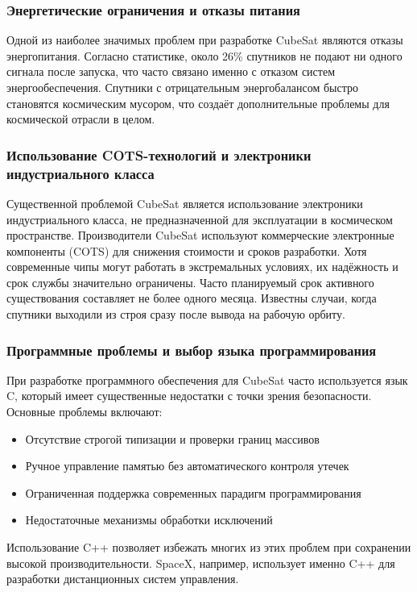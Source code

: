 \subsubsection{Энергетические ограничения и отказы питания}
Одной из наиболее значимых проблем при разработке CubeSat являются отказы энергопитания. Согласно статистике, около 26\% спутников не подают ни одного сигнала после запуска, что часто связано именно с отказом систем энергообеспечения\cite{kulu2020nanosats}. Спутники с отрицательным энергобалансом быстро становятся космическим мусором, что создаёт дополнительные проблемы для космической отрасли в целом.

\subsubsection{Использование COTS-технологий и электроники индустриального класса}
Существенной проблемой CubeSat является использование электроники индустриального класса, не предназначенной для эксплуатации в космическом пространстве\cite{scholz2015cots}. Производители CubeSat используют коммерческие электронные компоненты (COTS) для снижения стоимости и сроков разработки. Хотя современные чипы могут работать в экстремальных условиях, их надёжность и срок службы значительно ограничены. Часто планируемый срок активного существования составляет не более одного месяца\cite{scholz2015cots}. Известны случаи, когда спутники выходили из строя сразу после вывода на рабочую орбиту.

\subsubsection{Программные проблемы и выбор языка программирования}
При разработке программного обеспечения для CubeSat часто используется язык C, который имеет существенные недостатки с точки зрения безопасности. Основные проблемы включают:

\begin{itemize}
    \item Отсутствие строгой типизации и проверки границ массивов
    \item Ручное управление памятью без автоматического контроля утечек
    \item Ограниченная поддержка современных парадигм программирования
    \item Недостаточные механизмы обработки исключений
\end{itemize}

Использование C++ позволяет избежать многих из этих проблем при сохранении высокой производительности. SpaceX, например, использует именно C++ для разработки дистанционных систем управления\cite{wooster2020spacex}.

